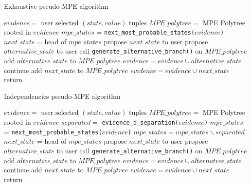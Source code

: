 \begin{algorithm}[htp!]
	\caption{Exhaustive pseudo-MPE algorithm}
	\label{alg:pseudo-mpe-exhaustive}
	\begin{algorithmic}[1]
		\State $evidence = $ user selected $(state,value)$ tuples
		\State $MPE\_polytree = $ MPE Polytree rooted in $evidence$
			\State $mpe\_states$ = \texttt{next\_most\_probable\_states($evidence$)}
				\State $next\_state$ = head of $mpe\_states$ 
				\State propose $next\_state$ to user 
						\State propose $alternative\_state$ to user 
							\State call \texttt{generate\_alternative\_branch()} on $MPE\_polytree$ 
							\State add $alternative\_state$ to $MPE\_polytree$
							\State $evidence = evidence \cup alternative\_state$
						\Else
							\State continue
						\EndIf
					\EndFor
				\Else
					\State add $next\_state$ to $MPE\_polytree$
					\State $evidence = evidence \cup next\_state$
				\EndIf
			\Else 
				\State return
			\EndIf
		\EndWhile
	\end{algorithmic}
\end{algorithm} 

\begin{algorithm}[htp!]
	\caption{Independencies pseudo-MPE algorithm}
	\label{alg:pseudo-mpe-independencies}
	\begin{algorithmic}[1]
		\State $evidence = $ user selected $(state,value)$ tuples
		\State $MPE\_polytree = $ MPE Polytree rooted in $evidence$
			\State $separated = $ \texttt{evidence\_d\_separation($evidence$)} 
			\State $mpe\_states$ = \texttt{next\_most\_probable\_states($evidence$)}
			\State $mpe\_states = mpe\_states \smallsetminus separated$ 
				\State $next\_state$ = head of $mpe\_states$ 
				\State propose $next\_state$ to user 
						\State propose $alternative\_state$ to user 
							\State call \texttt{generate\_alternative\_branch()} on $MPE\_polytree$ 
							\State add $alternative\_state$ to $MPE\_polytree$
							\State $evidence = evidence \cup alternative\_state$
						\Else
							\State continue 
						\EndIf
					\EndFor
				\Else
					\State add $next\_state$ to $MPE\_polytree$
					\State $evidence = evidence \cup next\_state$
				\EndIf
			\Else 
				\State return 
			\EndIf
		\EndWhile
	\end{algorithmic}
\end{algorithm} 

